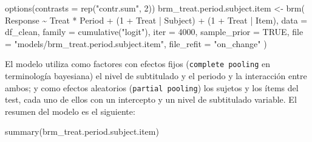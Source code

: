 \documentclass[
  12pt,
  a4paper,
  extrafontsizes,
  onecolumn,
  openright,
  table]{memoir}
\newenvironment{Shaded}{\begin{snugshade}}{\end{snugshade}}
\newcommand{\AttributeTok}[1]{\textcolor[rgb]{0.40,0.45,0.13}{#1}}
\newcommand{\ConstantTok}[1]{\textcolor[rgb]{0.56,0.35,0.01}{#1}}
\newcommand{\DecValTok}[1]{\textcolor[rgb]{0.68,0.00,0.00}{#1}}
\newcommand{\FunctionTok}[1]{\textcolor[rgb]{0.28,0.35,0.67}{#1}}
\newcommand{\NormalTok}[1]{\textcolor[rgb]{0.00,0.23,0.31}{#1}}
\newcommand{\OtherTok}[1]{\textcolor[rgb]{0.00,0.23,0.31}{#1}}
\newcommand{\SpecialCharTok}[1]{\textcolor[rgb]{0.37,0.37,0.37}{#1}}
\newcommand{\StringTok}[1]{\textcolor[rgb]{0.13,0.47,0.30}{#1}}
\begin{document}
\begin{Shaded}
\begin{Highlighting}[]
\FunctionTok{options}\NormalTok{(}\AttributeTok{contrasts =} \FunctionTok{rep}\NormalTok{(}\StringTok{"contr.sum"}\NormalTok{, }\DecValTok{2}\NormalTok{))}
\NormalTok{brm\_treat.period.subject.item }\OtherTok{\textless{}{-}} \FunctionTok{brm}\NormalTok{(}
\NormalTok{    Response }\SpecialCharTok{\textasciitilde{}}\NormalTok{ Treat }\SpecialCharTok{*}\NormalTok{ Period }\SpecialCharTok{+}\NormalTok{ (}\DecValTok{1} \SpecialCharTok{+}\NormalTok{ Treat }\SpecialCharTok{|}\NormalTok{ Subject) }\SpecialCharTok{+}\NormalTok{ (}\DecValTok{1} \SpecialCharTok{+}\NormalTok{ Treat }\SpecialCharTok{|}\NormalTok{ Item),}
    \AttributeTok{data =}\NormalTok{ df\_clean,}
    \AttributeTok{family =} \FunctionTok{cumulative}\NormalTok{(}\StringTok{"logit"}\NormalTok{),}
    \AttributeTok{iter =} \DecValTok{4000}\NormalTok{,}
    \AttributeTok{sample\_prior =} \ConstantTok{TRUE}\NormalTok{,}
    \AttributeTok{file =} \StringTok{"models/brm\_treat.period.subject.item"}\NormalTok{,}
    \AttributeTok{file\_refit =} \StringTok{"on\_change"}
\NormalTok{)}
\end{Highlighting}
\end{Shaded}

\normalsize

El modelo utiliza como factores con efectos fijos
(\texttt{complete\ pooling} en terminología bayesiana) el nivel de
subtitulado y el periodo y la interacción entre ambos; y como efectos
aleatorios (\texttt{partial\ pooling}) los sujetos y los ítems del test,
cada uno de ellos con un intercepto y un nivel de subtitulado variable.
El resumen del modelo es el siguiente:

\tiny

\begin{Shaded}
\begin{Highlighting}[]
\FunctionTok{summary}\NormalTok{(brm\_treat.period.subject.item)}
\end{Highlighting}
\end{Shaded}
\end{document}
